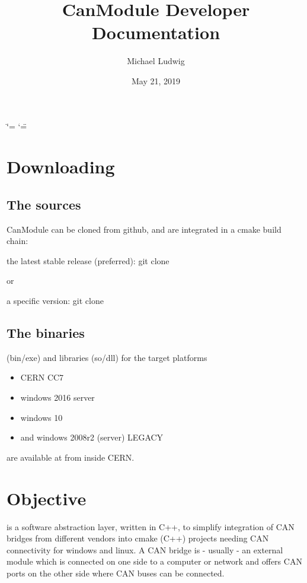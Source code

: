 \documentclass[letterpaper,10pt,english]{sphinxmanual}
\title{CanModule Developer Documentation}
\date{May 21, 2019}
\author{Michael Ludwig}
\begin{document}
\ifdefined\shorthandoff
  \ifnum\catcode`\=\string=\active\shorthandoff{=}\fi
  \ifnum\catcode`\"=\active{}\fi
\fi

\pagestyle{empty}
\sphinxmaketitle
\pagestyle{plain}
\sphinxtableofcontents
\pagestyle{normal}
\label{\detokenize{index::doc}}



\chapter{Downloading}
\label{\detokenize{downloading:downloading}}\label{\detokenize{downloading::doc}}

\section{The sources}
\label{\detokenize{downloading:the-sources}}
CanModule can be cloned from github, and are integrated in a cmake build chain:

the latest stable release (preferred):
git clone  

or

a specific version:
git clone  


\section{The binaries}
\label{\detokenize{downloading:the-binaries}}
(bin/exe) and libraries (so/dll) for the target platforms
\begin{itemize}
\item {} 
CERN CC7

\item {} 
windows 2016 server

\item {} 
windows 10

\item {} 
and windows 2008r2 (server) LEGACY

\end{itemize}

are available at  from inside CERN.


\chapter{Objective}
\label{\detokenize{objective:objective}}\label{\detokenize{objective::doc}}
 is a software abstraction layer, written in C++, to simplify integration
of CAN bridges from different vendors into cmake (C++) projects needing CAN connectivity
for windows and linux. A CAN bridge is - usually - an external module which is connected
on one side to a computer or network and offers CAN ports on the other side where CAN buses
can be connected.
\end{document}
